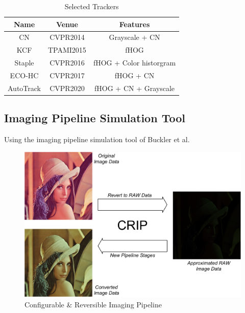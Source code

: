 \documentclass{beamer}
\begin{document}
\begin{frame}
    \begin{table}[htpb]
        \centering
        \caption{Selected Trackers}
        \label{tab:number}
        \begin{tabular}{ccc}\toprule
            Name      & Venue     & Features                \\\midrule
            CN        & CVPR2014  & Grayscale + CN          \\
            KCF       & TPAMI2015 & fHOG                    \\
            Staple    & CVPR2016  & fHOG + Color historgram \\
            ECO-HC    & CVPR2017  & fHOG + CN               \\
            AutoTrack & CVPR2020  & fHOG + CN + Grayscale   \\\bottomrule
        \end{tabular}
    \end{table}
\end{frame}

\subsection{Imaging Pipeline Simulation Tool}

\begin{frame}

    Using the imaging pipeline simulation tool of Buckler et al.
    
    \begin{figure}[htpb]
        \begin{center}
            \includegraphics[width=0.65\linewidth]{fig/crip.pdf}
            \caption{Configurable \& Reversible Imaging Pipeline}
        \end{center}
    \end{figure}
\end{frame}
\end{document}
